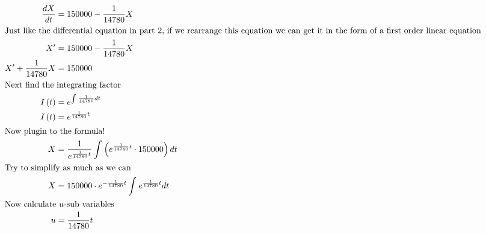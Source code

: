 \documentclass[12pt]{article}
\begin{document}
\begin{align}
  \frac{dX}{dt}                                                                            & =150000-\frac{1}{14780}X                                                                                                                                                  \\
  \intertext{Just like the differential equation in part 2, if we rearrange this equation we can get it in the form of a first order linear equation}
  X'                                                                                       & =150000-\frac{1}{14780}X                                                                                                                                                  \\
  X'+\frac{1}{14780}X                                                                      & =150000                                                                                                                                                                   \\
  \intertext{Next find the integrating factor}
  I\left(t\right)                                                                          & =e^{\int_{ }^{ }\frac{1}{14780}dt}                                                                                                                                        \\
  I\left(t\right)                                                                          & =e^{\frac{1}{14780}t}                                                                                                                                                     \\
  \intertext{Now plugin to the formula!}
  X                                                                                        & =\frac{1}{e^{\frac{1}{14780}t}}\int_{ }^{ }\left(e^{\frac{1}{14780}t}\cdot150000\right)dt                                                                                 \\
  \intertext{Try to simplify as much as we can}
  X                                                                                        & =150000\cdot e^{-\frac{1}{14780}t}\int_{ }^{ }e^{\frac{1}{14780}t}dt                                                                                                      \\
  \intertext{Now calculate $u$-sub variables}
  u                                                                                        & =\frac{1}{14780}t                                                                                                                                                         \\

\end{align}
\end{document}
